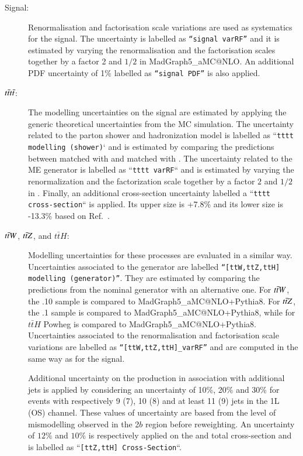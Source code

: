 \begin{description}
\item[Signal:]  Renormalisation and factorisation scale variations are used as systematics for the signal.  The uncertainty is labelled as \texttt{``signal varRF''} and it is estimated by varying the renormalisation and the factorisation scales together by a factor 2 and $1/2$ in MadGraph5\_aMC@NLO. An additional PDF uncertainty of 1\% labelled as \texttt{``signal PDF''} is also applied. 

\item[$t\bar{t}t\bar t $:] The modelling uncertainties on the \tttt signal are estimated by applying the generic theoretical uncertainties from the MC simulation.
The uncertainty related to the parton shower and hadronization model is labelled as ``\texttt{tttt modelling (shower)}` and is estimated by comparing the predictions between \mgamc matched with \pythiaeight and \mgamc matched with \herwigseven.
The uncertainty related to the ME generator is labelled as ``\texttt{tttt varRF}`` and is estimated by varying the renormalization and the factorization scale together by a factor $2$ and $1/2$ in \mgamc.
Finally, an additional cross-section uncertainty labelled a ``\texttt{tttt cross-section}`` is applied. Its upper size is +7.8\% and its lower size is -13.3\% based on Ref.~\cite{vanBeekveld:2022hty}.


\item[$t\bar{t}W $, $t\bar{t}Z $, and $t\bar tH$:] Modelling uncertainties for these processes are evaluated in a similar way. Uncertainties associated to the generator are labelled \texttt{``[ttW,ttZ,ttH] modelling (generator)''}. They are estimated by comparing the predictions from the nominal generator with an alternative one. For $t\bar{t}W $, the .10 sample is compared to MadGraph5\_aMC@NLO+Pythia8. For $t\bar{t}Z $, the .1 sample  is compared to MadGraph5\_aMC@NLO+Pythia8, while for $t\bar tH$  Powheg is compared to MadGraph5\_aMC@NLO+Pythia8. Uncertainties associated to the renormalisation and factorisation scale variations are labelled as \texttt{``[ttW,ttZ,ttH]\_varRF''} and are computed in the same way as for the signal.

  Additional uncertainty on the production in association with additional jets is applied by considering an uncertainty of 10\%, 20\% and 30\% for events with respectively 9 (7), 10 (8) and at least 11 (9) jets  in the 1L (OS) channel.
These values of uncertainty are based from the level of \ttjets \Nj mismodelling observed in the 2$b$ region before reweighting.
An uncertainty of $12\%$ and $10\%$ is respectively applied on the \ttZ and \ttH total cross-section and is labelled as ``\texttt{[ttZ,ttH] Cross-Section}``.


\end{description}

